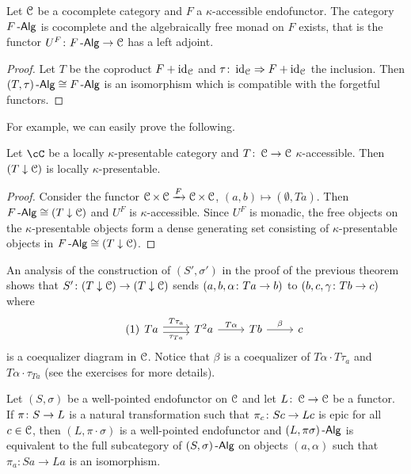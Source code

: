\documentclass[a4paper,11pt,oneside,openany]{scrbook}
\begin{document}
\begin{thm}
	Let $ \operatorname{\mathcal{C}} $ be a cocomplete category and $ F $ a $ \kappa $-accessible
    endofunctor. The category $ F\operatorname{-\mathsf{Alg}} $ is cocomplete and the algebraically free
    monad on $ F $ exists, that is the functor $U^F \colon F\operatorname{-\mathsf{Alg}} \to \operatorname{\mathcal{C}} $ has a
    left adjoint.
\end{thm}
\begin{proof}
	Let $ T $ be the coproduct $ F + \operatorname{id}_{\operatorname{\mathcal{C}}} $ and $ \tau\colon
    \operatorname{id}_{\operatorname{\mathcal{C}}}\Rightarrow F+\operatorname{id}_{\operatorname{\mathcal{C}}} $ the inclusion.	Then $  (T,\tau)\operatorname{-\mathsf{Alg}} \cong
    F\operatorname{-\mathsf{Alg}} $ is an isomorphism which is compatible with the forgetful functors.
\end{proof}

For example, we can easily prove the following.

\begin{prop}
	Let $ \cC $ be a locally $ \kappa $-presentable category and $ T \colon \operatorname{\mathcal{C}}
		\to \operatorname{\mathcal{C}} $ $ \kappa $-accessible. Then $ (T\downarrow\operatorname{\mathcal{C}}) $ is locally $ \kappa
	$-presentable.
\end{prop}
\begin{proof}
	Consider the functor $ \operatorname{\mathcal{C}} \times \operatorname{\mathcal{C}} \xrightarrow{F} \operatorname{\mathcal{C}} \times \operatorname{\mathcal{C}} $, $ (a,b)\mapsto (\emptyset, Ta) $.
	Then $ F\operatorname{-\mathsf{Alg}} \cong (T\downarrow\operatorname{\mathcal{C}}) $ and $ U^F $ is $ \kappa $-accessible.
	Since $ U^F  $ is monadic, the free objects on the $ \kappa $-presentable
    objects form a dense generating set consisting of $ \kappa $-presentable
    objects in $ F\operatorname{-\mathsf{Alg}} \cong (T\downarrow\operatorname{\mathcal{C}}) $.
\end{proof}
\begin{rmk}
	An analysis of the construction of $ (S',\sigma') $ in the proof of the
    previous theorem shows that $ S' \colon (T\downarrow\operatorname{\mathcal{C}}) \to (T\downarrow\operatorname{\mathcal{C}}) $
    sends $ (a,b,\alpha \colon Ta \to b) $ to $ (b,c, \gamma \colon Tb \to c) $
    where
	\begin{displaymath}\tag{1}\label{fork1}
		\begin{tikzcd}
			T a \arrow[r,shift left, "T \tau_a"]\arrow[r,shift right, "\tau_{Ta}"']& T^2 a \arrow[r, "T\alpha" ] & Tb \arrow[r, "\beta"]  & c
		\end{tikzcd}
	\end{displaymath}
	is a coequalizer diagram in $ \operatorname{\mathcal{C}} $.
	Notice that $ \beta $ is a coequalizer of $ T\alpha \cdot T\tau_a $ and $
		T\alpha \cdot \tau_{Ta} $ (see the exercises for more details).
\end{rmk}
\begin{prop}
	Let $(S,\sigma)$ be a well-pointed endofunctor on $\operatorname{\mathcal{C}}$ and let
    $L\colon\operatorname{\mathcal{C}}\to\operatorname{\mathcal{C}}$ be a functor.
	If $\pi\colon S\to L$ is a natural transformation such that $\pi_c\colon
	Sc\to Lc$ is epic for all $c\in\operatorname{\mathcal{C}}$, then $(L,\pi\cdot\sigma) $ is
    a well-pointed endofunctor and $(L,\pi\sigma)\operatorname{-\mathsf{Alg}}$ is equivalent to
    the full subcategory of $(S,\sigma)\operatorname{-\mathsf{Alg}}$ on objects $(a,\alpha)$
    such that $\pi_a\colon Sa\to La$ is an isomorphism.
\end{prop}
\end{document}
